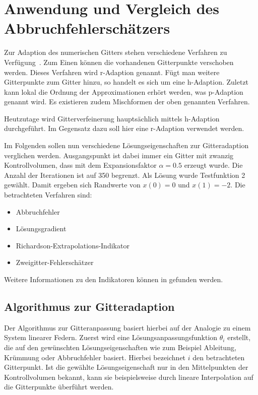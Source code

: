 \chapter{Anwendung und Vergleich des Abbruchfehlerschätzers}

Zur Adaption des numerischen Gitters stehen verschiedene Verfahren zu Verfügung~\cite{roy2}.
Zum Einen können die vorhandenen Gitterpunkte verschoben werden. Dieses Verfahren wird r-Adaption
genannt. Fügt man weitere Gitterpunkte zum Gitter hinzu, so handelt es sich um eine h-Adaption.
Zuletzt kann lokal die Ordnung der Approximationen erhört werden, was p-Adaption genannt wird.
Es existieren zudem Mischformen der oben genannten Verfahren.

Heutzutage wird Gitterverfeinerung hauptsächlich mittels h-Adaption durchgeführt. Im Gegensatz dazu
soll hier eine r-Adaption verwendet werden.

Im Folgenden sollen nun verschiedene Lösungseigenschaften zur Gitteradaption verglichen werden.
Ausgangspunkt ist dabei immer ein Gitter mit zwanzig Kontrollvolumen, dass mit dem
Expansionsfaktor $\alpha=0.5$ erzeugt wurde. Die Anzahl der Iterationen ist auf 350 begrenzt.
Als Lösung wurde Testfunktion 2 gewählt. Damit ergeben sich Randwerte von $x(0)=0$ und $x(1)=-2$.
Die betrachteten Verfahren sind:
\begin{itemize}
  \item Abbruchfehler
  \item Lösungsgradient
  \item Richardson-Extrapolations-Indikator
  \item Zweigitter-Fehlerschätzer
\end{itemize}
Weitere Informationen zu den Indikatoren können in \cite{celik} gefunden werden.




\section{Algorithmus zur Gitteradaption}

Der Algorithmus zur Gitteranpassung basiert hierbei auf der Analogie zu einem System
linearer Federn.
Zuerst wird eine Lösungsanpassungsfunktion $\theta_i$ erstellt, die auf den gewünschten
Lösungseigenschaften wie zum Beispiel Ableitung, Krümmung oder Abbruchfehler basiert. Hierbei
bezeichnet $i$ den betrachteten Gitterpunkt. Ist die gewählte Lösungseigenschaft nur in den
Mittelpunkten der Kontrollvolumen bekannt, kann sie beispielsweise durch lineare Interpolation
auf die Gitterpunkte überführt werden.

